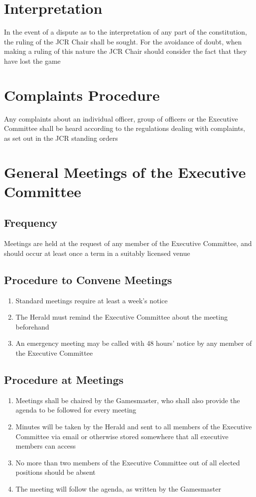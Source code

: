 \documentclass[hidelinks, 12pt, a4paper]{article}
\begin{document}
\section{Interpretation}
In the event of a dispute as to the interpretation of any part of the constitution, the ruling of the JCR Chair shall be sought. For the avoidance of doubt, when making a ruling of this nature the JCR Chair should consider the fact that they have lost the game

\section{Complaints Procedure}
Any complaints about an individual officer, group of officers or the Executive Committee shall be heard according to the regulations dealing with complaints, as set out in the JCR standing orders

\section{General Meetings of the Executive Committee}
\subsection{Frequency}
Meetings are held at the request of any member of the Executive Committee, and should occur at least once a term in a suitably licensed venue
\subsection{Procedure to Convene Meetings}
\begin{enumerate}
	\item Standard meetings require at least a week’s notice
	\item The Herald must remind the Executive Committee about the meeting beforehand
	\item An emergency meeting may be called with 48 hours’ notice by any member of the Executive Committee
\end{enumerate}

\subsection{Procedure at Meetings}
\begin{enumerate}
	\item Meetings shall be chaired by the Gamesmaster, who shall also provide the agenda to be followed for every meeting
	\item Minutes will be taken by the Herald and sent to all members of the Executive Committee via email or otherwise stored somewhere that all executive members can access
	\item No more than two members of the Executive Committee out of all elected positions should be absent
	\item The meeting will follow the agenda, as written by the Gamesmaster
\end{enumerate}
\end{document}
